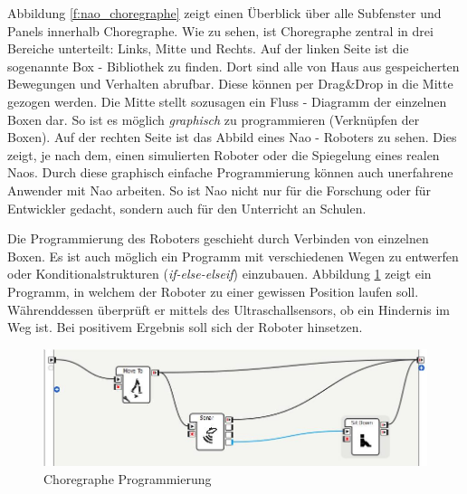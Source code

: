 Abbildung \ref{f:nao_choregraphe} zeigt einen Überblick über alle Subfenster und Panels innerhalb Choregraphe. Wie zu sehen, ist Choregraphe zentral in drei Bereiche unterteilt: Links, Mitte und Rechts.
Auf der linken Seite ist die sogenannte Box - Bibliothek zu finden. Dort sind alle von Haus aus gespeicherten Bewegungen und Verhalten abrufbar. Diese können per Drag\&Drop in die Mitte gezogen werden. Die Mitte stellt sozusagen ein Fluss - Diagramm der einzelnen Boxen dar. So ist es möglich \textit{graphisch} zu programmieren (Verknüpfen der Boxen). Auf der rechten Seite ist das Abbild eines Nao - Roboters zu sehen. Dies zeigt, je nach dem, einen simulierten Roboter oder die Spiegelung eines realen Naos. 
Durch diese graphisch einfache Programmierung können auch unerfahrene Anwender mit Nao arbeiten. So ist Nao nicht nur für die Forschung oder für Entwickler gedacht, sondern auch für den Unterricht an Schulen.

Die Programmierung des Roboters geschieht durch Verbinden von einzelnen Boxen. Es ist auch möglich ein Programm mit verschiedenen Wegen zu entwerfen oder Konditionalstrukturen (\textit{if-else-elseif}) einzubauen. Abbildung \ref{f:nao_choregrapheProg} zeigt ein Programm, in welchem der Roboter zu einer gewissen Position laufen soll. Währenddessen überprüft er mittels des Ultraschallsensors, ob ein Hindernis im Weg ist. Bei positivem Ergebnis soll sich der Roboter hinsetzen.

\begin{figure}[H]						
	\centering							
	\includegraphics[scale=.6]{Bilder/choregraphe_prog.jpg}			
	\caption{Choregraphe Programmierung}						
	\label{f:nao_choregrapheProg}						
\end{figure}

